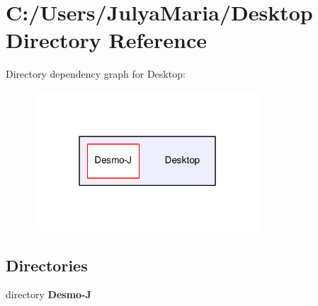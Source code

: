 \section{C\-:/\-Users/\-Julya\-Maria/\-Desktop Directory Reference}
\label{dir_a24ff6d957f0ebb48178d8733a2d1a67}
Directory dependency graph for Desktop\-:
\nopagebreak
\begin{figure}[H]
\begin{center}
\leavevmode
\includegraphics[width=240pt]{dir_a24ff6d957f0ebb48178d8733a2d1a67_dep}
\end{center}
\end{figure}
\subsection*{Directories}
\begin{DoxyCompactItemize}
\item 
directory {\bf Desmo-\/\-J}
\end{DoxyCompactItemize}
